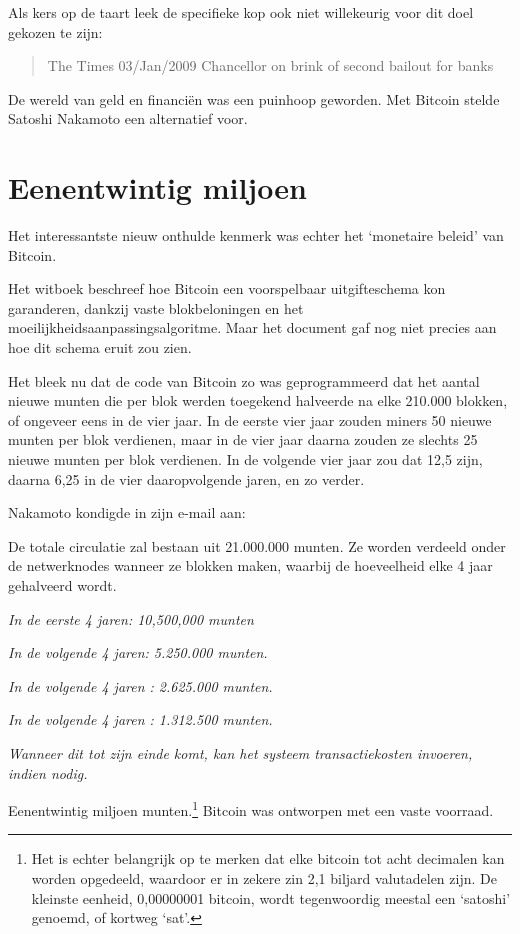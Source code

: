 \documentclass[smalldemyvopaper,11pt,twoside,onecolumn,openright,extrafontsizes,hidelinks]{memoir}
\begin{document}
Als kers op de taart leek de specifieke kop ook niet willekeurig voor
dit doel gekozen te zijn:

\begin{quote}
The Times 03/Jan/2009 Chancellor on brink of second bailout for banks
\end{quote}

De wereld van geld en financiën was een puinhoop geworden. Met Bitcoin
stelde Satoshi Nakamoto een alternatief voor.

\section{Eenentwintig miljoen}\label{eenentwintig-miljoen}

Het interessantste nieuw onthulde kenmerk was echter het `monetaire
beleid' van Bitcoin.

Het witboek beschreef hoe Bitcoin een voorspelbaar uitgifteschema kon
garanderen, dankzij vaste blokbeloningen en het
moeilijkheidsaanpassingsalgoritme. Maar het document gaf nog niet
precies aan hoe dit schema eruit zou zien.

Het bleek nu dat de code van Bitcoin zo was geprogrammeerd dat het
aantal nieuwe munten die per blok werden toegekend halveerde na elke
210.000 blokken, of ongeveer eens in de vier jaar. In de eerste vier
jaar zouden miners 50 nieuwe munten per blok verdienen, maar in de vier
jaar daarna zouden ze slechts 25 nieuwe munten per blok verdienen. In de
volgende vier jaar zou dat 12,5 zijn, daarna 6,25 in de vier
daaropvolgende jaren, en zo verder.

Nakamoto kondigde in zijn e-mail aan:

De totale circulatie zal bestaan uit 21.000.000 munten. Ze worden
verdeeld onder de netwerknodes wanneer ze blokken maken, waarbij de
hoeveelheid elke 4 jaar gehalveerd wordt.

\emph{In de eerste 4 jaren: 10,500,000 munten}

\emph{In de volgende 4 jaren: 5.250.000 munten.}

\emph{In de volgende 4 jaren : 2.625.000 munten.}

\emph{In de volgende 4 jaren : 1.312.500 munten.}

\emph{Wanneer dit tot zijn einde komt, kan het systeem transactiekosten
invoeren, indien nodig.}

Eenentwintig miljoen munten.\footnote{Het is echter belangrijk op te
  merken dat elke bitcoin tot acht decimalen kan worden opgedeeld,
  waardoor er in zekere zin 2,1 biljard valutadelen zijn. De kleinste
  eenheid, 0,00000001 bitcoin, wordt tegenwoordig meestal een `satoshi'
  genoemd, of kortweg `sat'.} Bitcoin was ontworpen met een vaste
voorraad.
\end{document}
